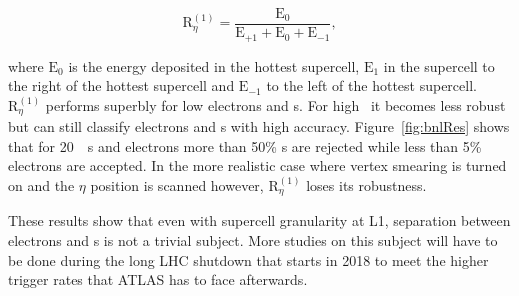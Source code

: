 \begin{equation}
\textrm{R}_{\eta}^{(1)} = \frac{\textrm{E}_{0}}{\textrm{E}_{+1} + \textrm{E}_{0} + \textrm{E}_{-1}},
\end{equation}  

where $\textrm{E}_{0}$ is the energy deposited in the hottest supercell, $\textrm{E}_{1}$ in the 
supercell to the right of the hottest supercell and $\textrm{E}_{-1}$ to the left of the 
hottest supercell. $\textrm{R}_{\eta}^{(1)}$ performs superbly for low \pT electrons and \pizero s.
For high \pT\ it becomes less robust but can still classify electrons and \pizero s with high 
accuracy. Figure~\ref{fig:bnlRes} shows that for 20~\GeV\ \pizero s and electrons more than 50\% 
\pizero s are rejected while less than 5\% electrons are accepted. In the more realistic case 
where vertex smearing is turned on and the $\eta$ position is scanned however, $\textrm{R}_{\eta}^{(1)}$ 
loses its robustness.   

\par These results show that even with supercell granularity at L1, separation between electrons 
and \pizero s is not a trivial subject. More studies on this subject will have to be done 
during the long LHC shutdown that starts in 2018 to meet the higher trigger rates that ATLAS has 
to face afterwards. 

